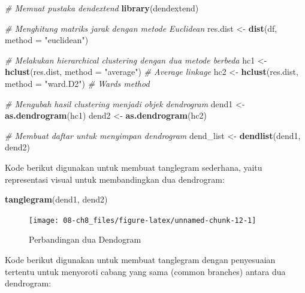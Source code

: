 \documentclass[
  oneside]{book}
\newenvironment{Shaded}{\begin{snugshade}}{\end{snugshade}}
\newcommand{\AttributeTok}[1]{\textcolor[rgb]{0.13,0.29,0.53}{#1}}
\newcommand{\CommentTok}[1]{\textcolor[rgb]{0.56,0.35,0.01}{\textit{#1}}}
\newcommand{\FunctionTok}[1]{\textcolor[rgb]{0.13,0.29,0.53}{\textbf{#1}}}
\newcommand{\NormalTok}[1]{#1}
\newcommand{\OtherTok}[1]{\textcolor[rgb]{0.56,0.35,0.01}{#1}}
\newcommand{\StringTok}[1]{\textcolor[rgb]{0.31,0.60,0.02}{#1}}
\begin{document}
\begin{Shaded}
\begin{Highlighting}[]
\CommentTok{\# Memuat pustaka dendextend}
\FunctionTok{library}\NormalTok{(dendextend)}

\CommentTok{\# Menghitung matriks jarak dengan metode Euclidean}
\NormalTok{res.dist }\OtherTok{\textless{}{-}} \FunctionTok{dist}\NormalTok{(df, }\AttributeTok{method =} \StringTok{"euclidean"}\NormalTok{)}

\CommentTok{\# Melakukan hierarchical clustering dengan dua metode berbeda}
\NormalTok{hc1 }\OtherTok{\textless{}{-}} \FunctionTok{hclust}\NormalTok{(res.dist, }\AttributeTok{method =} \StringTok{"average"}\NormalTok{)  }\CommentTok{\# Average linkage}
\NormalTok{hc2 }\OtherTok{\textless{}{-}} \FunctionTok{hclust}\NormalTok{(res.dist, }\AttributeTok{method =} \StringTok{"ward.D2"}\NormalTok{)  }\CommentTok{\# Ward\textquotesingle{}s method}

\CommentTok{\# Mengubah hasil clustering menjadi objek dendrogram}
\NormalTok{dend1 }\OtherTok{\textless{}{-}} \FunctionTok{as.dendrogram}\NormalTok{(hc1)}
\NormalTok{dend2 }\OtherTok{\textless{}{-}} \FunctionTok{as.dendrogram}\NormalTok{(hc2)}

\CommentTok{\# Membuat daftar untuk menyimpan dendrogram}
\NormalTok{dend\_list }\OtherTok{\textless{}{-}} \FunctionTok{dendlist}\NormalTok{(dend1, dend2)}
\end{Highlighting}
\end{Shaded}

Kode berikut digunakan untuk membuat tanglegram sederhana, yaitu representasi visual untuk membandingkan dua dendrogram:

\begin{Shaded}
\begin{Highlighting}[]
\FunctionTok{tanglegram}\NormalTok{(dend1, dend2)}
\end{Highlighting}
\end{Shaded}

\begin{figure}[h]

{\centering \texttt{[image: 08-ch8\_files/figure-latex/unnamed-chunk-12-1]} 

}

\caption{Perbandingan dua Dendogram}\label{fig:unnamed-chunk-12}
\end{figure}

Kode berikut digunakan untuk membuat tanglegram dengan penyesuaian tertentu untuk menyoroti cabang yang sama (common branches) antara dua dendrogram:
\end{document}
